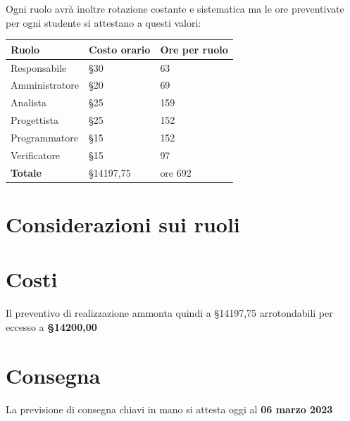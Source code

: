 Ogni ruolo avrà inoltre rotazione costante e sistematica ma le ore preventivate per ogni studente si attestano a questi valori:

\begin{center}
    \begin{tabularx}{10cm}{X |l|l}          
        \textbf{Ruolo} & \textbf{Costo orario} & \textbf{Ore per ruolo}\\
        \hline

        Responsabile & §30 & 63\\
        Amministratore & §20 & 69\\
        Analista & §25 & 159\\
        Progettista & §25 & 152\\
        Programmatore & §15 & 152\\
        Verificatore & §15 & 97\\
        \hline
        \textbf{Totale} & §14197,75 & ore 692
    \end{tabularx}
\end{center}

\section{Considerazioni sui ruoli}
\section{Costi}

Il preventivo di realizzazione ammonta quindi a §14197,75 arrotondabili per eccesso a \textbf{§14200,00}

\section{Consegna}

La previsione di consegna chiavi in mano si attesta oggi al \textbf{06 marzo 2023}
